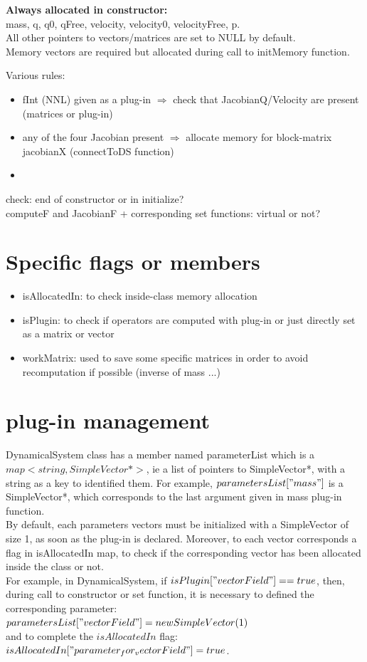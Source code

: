 \documentclass[10pt]{report}
\begin{document}
\textbf{Always allocated in constructor:} \\
mass, q, q0, qFree, velocity, velocity0, velocityFree, p. \\
All other pointers to vectors/matrices are set to NULL by default. \\
Memory vectors are required but allocated during call to initMemory function.

Various rules:
\begin{itemize}
\item fInt (NNL) given as a plug-in $\Rightarrow$ check that JacobianQ/Velocity are present (matrices or plug-in)
\item any of the four Jacobian present $\Rightarrow$ allocate memory for block-matrix jacobianX  (connectToDS function)
\item
\end{itemize}

check: end of constructor or in initialize? \\
computeF and JacobianF + corresponding set functions: virtual or not? \\


\section{Specific flags or members}

\begin{itemize}
\item isAllocatedIn: to check inside-class memory allocation
\item isPlugin: to check if operators are computed with plug-in or just directly set as a matrix or vector
\item workMatrix: used to save some specific matrices in order to avoid recomputation if possible (inverse of mass ...)
\end{itemize}

\section{plug-in management}
DynamicalSystem class has a member named parameterList which is a $map<string, SimpleVector*>$, ie a list of
pointers to SimpleVector*, with a string as a key to identified them.
For example, $parametersList["mass"]$ is a SimpleVector*, which corresponds to the last argument given in
mass plug-in function. \\
By default, each parameters vectors must be initialized with a SimpleVector of size 1, as soon as the plug-in is
declared. Moreover, to each vector corresponds a flag in isAllocatedIn map, to check if the corresponding vector has been
allocated inside the class or not. \\
For example, in DynamicalSystem, if $isPlugin["vectorField"]==true$, then, during call to constructor or set function,
it is necessary to defined the corresponding parameter: \\
$parametersList["vectorField"] = new SimpleVector(1)$ \\
and to complete the $isAllocatedIn$ flag: \\
$isAllocatedIn["parameter_for_vectorField"] = true$. \\
\end{document}
